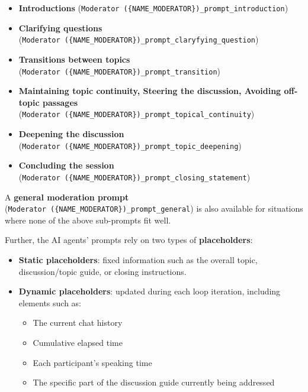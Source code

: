 \documentclass[
  letterpaper,
  DIV=11,
  numbers=noendperiod]{scrartcl}
\providecommand{\tightlist}{%
  \setlength{\itemsep}{0pt}\setlength{\parskip}{0pt}}
\begin{document}
\begin{itemize}
\tightlist
\item
  \textbf{Introductions}
  (\texttt{Moderator\ (\{NAME\_MODERATOR\})\_prompt\_introduction})
\item
  \textbf{Clarifying questions}
  (\texttt{Moderator\ (\{NAME\_MODERATOR\})\_prompt\_claryfying\_question})
\item
  \textbf{Transitions between topics}
  (\texttt{Moderator\ (\{NAME\_MODERATOR\})\_prompt\_transition})
\item
  \textbf{Maintaining topic continuity, Steering the discussion,
  Avoiding off-topic passages}
  (\texttt{Moderator\ (\{NAME\_MODERATOR\})\_prompt\_topical\_continuity})
\item
  \textbf{Deepening the discussion}
  (\texttt{Moderator\ (\{NAME\_MODERATOR\})\_prompt\_topic\_deepening})
\item
  \textbf{Concluding the session}
  (\texttt{Moderator\ (\{NAME\_MODERATOR\})\_prompt\_closing\_statement})
\end{itemize}

A \textbf{general moderation prompt}
(\texttt{Moderator\ (\{NAME\_MODERATOR\})\_prompt\_general}) is also
available for situations where none of the above sub-prompts fit well.

Further, the AI agents' prompts rely on two types of
\textbf{placeholders}:

\begin{itemize}
\tightlist
\item
  \textbf{Static placeholders}: fixed information such as the overall
  topic, discussion/topic guide, or closing instructions.\\
\item
  \textbf{Dynamic placeholders}: updated during each loop iteration,
  including elements such as:

  \begin{itemize}
  \tightlist
  \item
    The current chat history\\
  \item
    Cumulative elapsed time\\
  \item
    Each participant's speaking time\\
  \item
    The specific part of the discussion guide currently being addressed
  \end{itemize}
\end{itemize}
\end{document}
